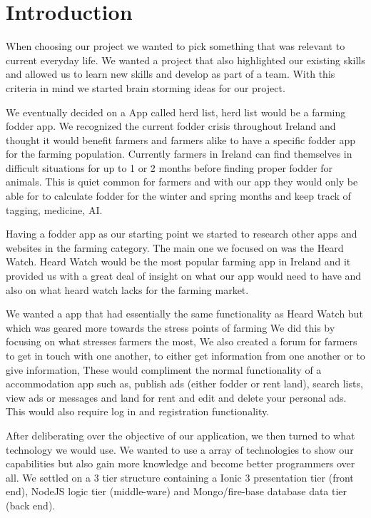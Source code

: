 \documentclass[12pt,a4paper,oneside,openany]{book}
\begin{document}
\chapter{Introduction}
When choosing our project we wanted to pick something that was relevant to current everyday life. We wanted a project that also highlighted our existing skills and allowed us to learn new skills and develop as part of a team. With this criteria in mind we started brain storming ideas for our project.  

We eventually decided on a App called herd list, herd list would be a farming fodder app. We recognized the current fodder crisis throughout Ireland and thought it would benefit farmers and farmers alike to have a specific fodder app for the farming population.
Currently farmers in Ireland can find themselves in difficult situations for up to 1 or 2 months before finding proper fodder for animals.
This is quiet common for farmers and with our app they would only be able for to calculate fodder for the winter and spring months and keep track of tagging, medicine, AI.

Having a fodder app as our starting point we started to research other apps and websites in the farming category. The main one we focused on was the Heard Watch. Heard Watch would be the most popular farming app in Ireland and it provided us with a great deal of insight on what our app would need to have and also on what heard watch lacks for the farming market.

We wanted a app that had essentially the same functionality as Heard Watch but which was geared more towards the stress points of farming We did this by focusing on what stresses farmers the most, We also created a forum for farmers to get in touch with one another, to either get information from one another or to give information, These would compliment the normal functionality of a accommodation app such as, publish ads (either fodder or rent land), search lists, view ads or messages and land for rent and edit and delete your personal ads. This would also require log in and registration functionality.  

After deliberating over the objective of our application, we then turned to what technology we would use. We wanted to use a array of technologies to show our capabilities but also gain more knowledge and become better programmers over all. We settled on a 3 tier structure containing a Ionic 3 presentation tier (front end), NodeJS logic tier (middle-ware)  and Mongo/fire-base database data tier (back end).
\end{document}
